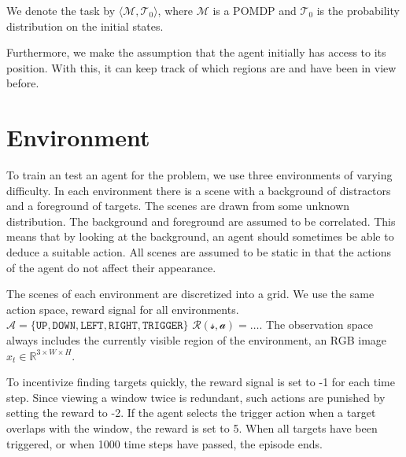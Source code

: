 We denote the task by \(\langle \mathcal{M}, \mathcal{T}_0 \rangle\), where \(\mathcal{M}\) is a POMDP and \(\mathcal{T}_0\) is the probability distribution on the initial states.

Furthermore, we make the assumption that the agent initially has access to its position.
With this, it can keep track of which regions are and have been in view before.


\section{Environment}
\label{sec:environment}

To train an test an agent for the problem, we use three environments of varying difficulty.
In each environment there is a scene with a background of distractors and a foreground of targets.
The scenes are drawn from some unknown distribution.
The background and foreground are assumed to be correlated.
This means that by looking at the background, an agent should sometimes be able to deduce a suitable action.
All scenes are assumed to be static in that the actions of the agent do not affect their appearance.

The scenes of each environment are discretized into a grid.
We use the same action space, reward signal for all environments.
\(\mathcal{A} = \lbrace \mathtt{UP}, \mathtt{DOWN}, \mathtt{LEFT}, \mathtt{RIGHT}, \mathtt{TRIGGER} \rbrace\)
\(\mathcal{R(s, a)} = \dots\).
The observation space always includes the currently visible region of the environment, an RGB image \(x_t \in \mathbb{R}^{3 \times W \times H}\).


To incentivize finding targets quickly, the reward signal is set to -1 for each time step.
Since viewing a window twice is redundant, such actions are punished by setting the reward to -2.
If the agent selects the trigger action when a target overlaps with the window, the reward is set to 5.
When all targets have been triggered, or when 1000 time steps have passed, the episode ends.

